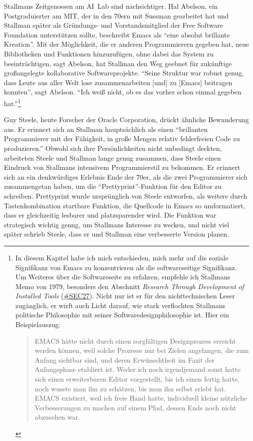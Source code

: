 Stallmans Zeitgenossen am AI~Lab sind nachsichtiger. Hal Abelson, ein Postgraduierter am MIT, der in den 70ern mit Sussman gearbeitet hat und Stallman später als Gründungs- und Vorstandsmitglied der Free Software Foundation unterstützen sollte, beschreibt Emacs als "`eine absolut brillante Kreation"'. Mit der Möglichkeit, die er anderen Programmierern gegeben hat, neue Bibliotheken und Funktionen hinzuzufügen, ohne dabei das System zu beeinträchtigen, sagt Abelson, hat Stallman den Weg geebnet für zukünftige großangelegte kollaborative Softwareprojekte. "`Seine Struktur war robust genug, dass Leute aus aller Welt lose zusammenarbeiten [und] zu [Emacs] beitragen konnten"', sagt Abelson. "`Ich weiß nicht, ob es das vorher schon einmal gegeben hat."'\footnote{In diesem Kapitel habe ich mich entschieden, mich mehr auf die soziale Signifikanz von Emacs zu konzentrieren als die softwareseitige Signifikanz. Um Weiteres über die Softwareseite zu erfahren, empfehle ich Stallmans Memo von 1979, besonders den Abschnitt \textit{Research Through Development of Installed Tools} (\href{http://www.gnu.org/software/emacs/emacs-paper.html\#SEC27}{\#SEC27}). Nicht nur ist er für den nichttechnischen Leser zugänglich, er wirft auch Licht darauf, wie stark verflochten Stallmans politische Philosophie mit seiner Softwaredesignphilosophie ist. Hier ein Beispielauszug:

\begin{quote}
EMACS hätte nicht durch einen sorgfältigen Designprozess erreicht werden können, weil solche Prozesse nur bei Zielen angelangen, die zum Anfang sichtbar sind, und deren Erwünschtheit im Fazit der Anfangsphase etabliert ist. Weder ich noch irgendjemand sonst hatte sich einen erweiterbaren Editor vorgestellt, bis ich einen fertig hatte, noch wusste man ihn zu schätzen, bis man ihn selbst erlebt hat. EMACS existiert, weil ich freie Hand hatte, individuell kleine nützliche Verbesserungen zu machen auf einem Pfad, dessen Ende noch nicht abzusehen war.
\end{quote}}

Guy Steele, heute Forscher der Oracle Corporation, drückt ähnliche Bewunderung aus. Er erinnert sich an Stallman hauptsächlich als einen "`brillanten Programmierer mit der Fähigkeit, in große Mengen relativ fehlerfreien Code zu produzieren."' Obwohl sich ihre Persönlichkeiten nicht unbedingt deckten, arbeiteten Steele und Stallman lange genug zusammen, dass Steele einen Eindruck von Stallmans intensivem Programmierstil zu bekommen. Er erinnert sich an ein denkwürdiges Erlebnis Ende der 70er, als die zwei Programmierer sich zusammengetan haben, um die "`Prettyprint"'-Funktion für den Editor zu schreiben. Prettyprint wurde ursprünglich von Steele entworfen, als weitere durch Tastenkombination startbare Funktion, die Quellcode in Emacs so umformatiert, dass er gleichzeitig lesbarer und platzsparender wird. Die Funktion war strategisch wichtig genug, um Stallmans Interesse zu wecken, und nicht viel später schrieb Steele, dass er und Stallman eine verbesserte Version planen.


